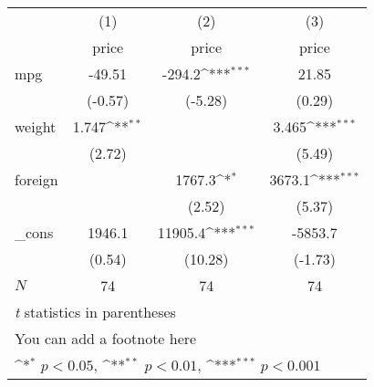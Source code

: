 {
\def\sym#1{\ifmmode^{#1}\else\(^{#1}\)\fi}
\begin{tabular}{l*{3}{c}}
\toprule
            &\multicolumn{1}{c}{(1)}&\multicolumn{1}{c}{(2)}&\multicolumn{1}{c}{(3)}\\
            &\multicolumn{1}{c}{price}&\multicolumn{1}{c}{price}&\multicolumn{1}{c}{price}\\
\midrule
mpg         &      -49.51         &      -294.2\sym{***}&       21.85         \\
            &     (-0.57)         &     (-5.28)         &      (0.29)         \\
\addlinespace
weight      &       1.747\sym{**} &                     &       3.465\sym{***}\\
            &      (2.72)         &                     &      (5.49)         \\
\addlinespace
foreign     &                     &      1767.3\sym{*}  &      3673.1\sym{***}\\
            &                     &      (2.52)         &      (5.37)         \\
\addlinespace
\_cons      &      1946.1         &     11905.4\sym{***}&     -5853.7         \\
            &      (0.54)         &     (10.28)         &     (-1.73)         \\
\midrule
\(N\)       &          74         &          74         &          74         \\
\bottomrule
\multicolumn{4}{l}{\footnotesize \textit{t} statistics in parentheses}\\
\multicolumn{4}{l}{\footnotesize You can add a footnote here}\\
\multicolumn{4}{l}{\footnotesize \sym{*} \(p<0.05\), \sym{**} \(p<0.01\), \sym{***} \(p<0.001\)}\\
\end{tabular}
}
